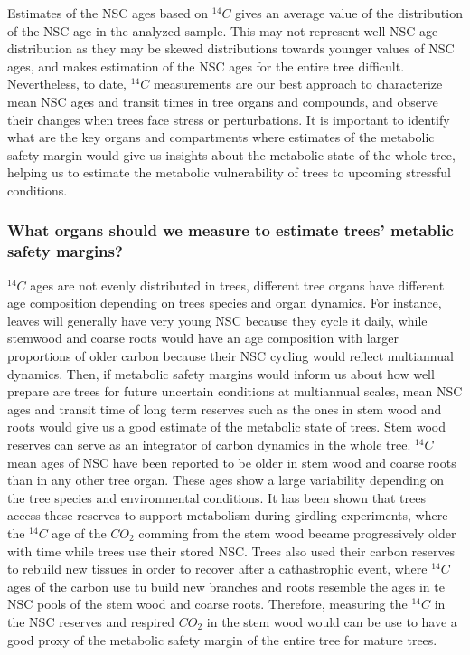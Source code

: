 \documentclass{article}
\begin{document}
Estimates of the NSC ages based on $^{14}C$ gives an average value of the distribution of the NSC age in the analyzed sample. 
This may not represent well NSC age distribution as they may be skewed distributions towards younger values of NSC ages, and makes estimation of the NSC ages for the entire tree difficult.  
Nevertheless, to date, $^{14}C$ measurements are our best approach to characterize mean NSC ages and transit times in tree organs and compounds, and observe their changes when trees face stress or perturbations. 
It is important to identify what are the key organs and compartments where estimates of the metabolic safety margin would give us insights about the metabolic state of the whole tree, helping us to estimate the metabolic vulnerability of trees to upcoming stressful conditions. 

\subsubsection{What organs should we measure to estimate trees' metablic safety margins?}

 $^{14}C$ ages are not evenly distributed in trees, different tree organs have different age composition depending on trees species and organ dynamics. 
For instance, leaves will generally have very young NSC because they cycle it daily, while stemwood and coarse roots would have an age composition with larger proportions of older carbon because their NSC cycling would reflect multiannual dynamics. 
Then, if metabolic safety margins would inform us about how well prepare are trees for future uncertain conditions at multiannual scales, mean NSC ages and transit time of long term reserves such as the ones in stem wood and roots would give us a good estimate of the metabolic state of trees.  
Stem wood reserves can serve as an integrator of carbon dynamics in the whole tree. 
$^{14}C$ mean ages of NSC have been reported to be older in stem wood and coarse roots than in any other tree organ. 
These ages show a large variability depending on the tree species and environmental conditions. 
It has been shown that trees access these reserves to support metabolism during girdling experiments, where the $^{14}C$ age of the $CO_{2}$ comming from the stem wood became progressively older with time while trees use their stored NSC. 
Trees also used their carbon reserves to rebuild new tissues in order to recover after a cathastrophic event, where $^{14}C$ ages of the carbon use tu build new branches and roots resemble the ages in te NSC pools of the stem wood and coarse roots.
Therefore, measuring the $^{14}C$ in the NSC reserves and respired $CO_{2}$ in the stem wood would can be use to have a good proxy of the metabolic safety margin of the entire tree for mature trees. 
\end{document}
